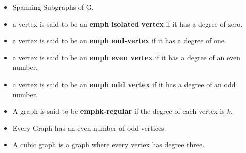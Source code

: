 \documentclass[]{report}
\begin{document}
\begin{itemize}
\item Spanning Subgraphs of G.
\item a vertex is said to be an \textbf{emph{ isolated vertex}} if it has a degree of zero.
\item a vertex is said to be an \textbf{emph{ end-vertex}} if it has a degree of one.
\item a vertex is said to be an \textbf{emph{ even vertex}} if it has a degree of an even number.
\item a vertex is said to be an \textbf{emph{ odd vertex}} if it has a degree of an odd number.
\item A graph is said to be \textbf{emph{k-regular}} if the degree of each vertex is $k$. 
\item Every Graph has an even number of odd vertices.
\item A cubic graph is a graph where every vertex has degree three.
\end{itemize}
\end{document}
